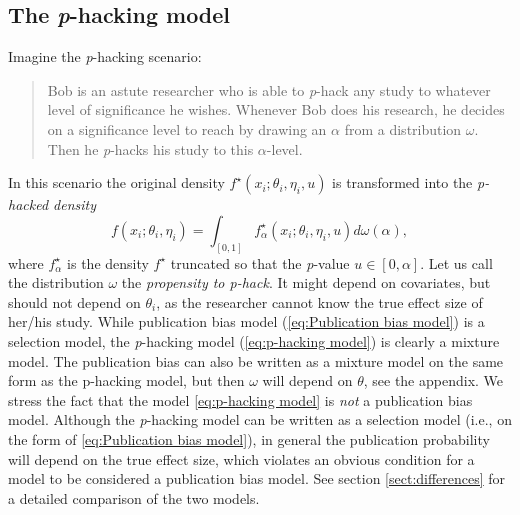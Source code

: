 \documentclass{article}
\theoremstyle{plain}
\theoremstyle{definition}
\begin{document}
\subsection{The \textit{p}-hacking model}\label{subsect:p-hacking}

Imagine the \textit{p}-hacking scenario:
\begin{quote}
Bob is an astute researcher who is able to \textit{p}-hack any study to whatever level of significance he wishes. Whenever Bob does his research, he decides on a significance level to reach by drawing an $\alpha$ from a distribution $\omega$. Then he \textit{p}-hacks his study to this $\alpha$-level.
\end{quote}
In this scenario the original density $f^{\star}\left(x_{i};\theta_{i},\eta_{i}, u\right)$
is transformed into the \emph{p-hacked density}
\begin{equation}\label{eq:p-hacking model}
f\left(x_{i};\theta_{i},\eta_{i}\right)=\int_{[0,1]}f_\alpha^{\star}\left(x_{i};\theta_{i},\eta_{i}, u\right)d\omega\left(\alpha\right),
\end{equation}
where $f_\alpha^{\star}$ is the density $f^{\star}$ truncated so that the \textit{p}-value $u\in\left[0,\alpha\right]$. Let us call the distribution $\omega$ the \emph{propensity to p-hack}. It might depend on covariates, but should not depend on $\theta_{i}$, as the researcher cannot know the true effect size of her/his study. While publication bias model (\ref{eq:Publication bias model}) is a selection model, the \textit{p}-hacking model (\ref{eq:p-hacking model}) is clearly a mixture model. The publication bias can also be written as a mixture model on the same form as the p-hacking model, but then $\omega$ will depend on $\theta$, see the appendix. We stress the fact that the model \eqref{eq:p-hacking model} is \emph{not} a publication bias model. Although the \textit{p}-hacking model can be written as a selection model (i.e., on the form of \eqref{eq:Publication bias model}), in general the publication probability will depend on the true effect size, which violates an obvious condition for a model to be considered a publication bias model. See section \ref{sect:differences} for a detailed comparison of the two models.
\end{document}
